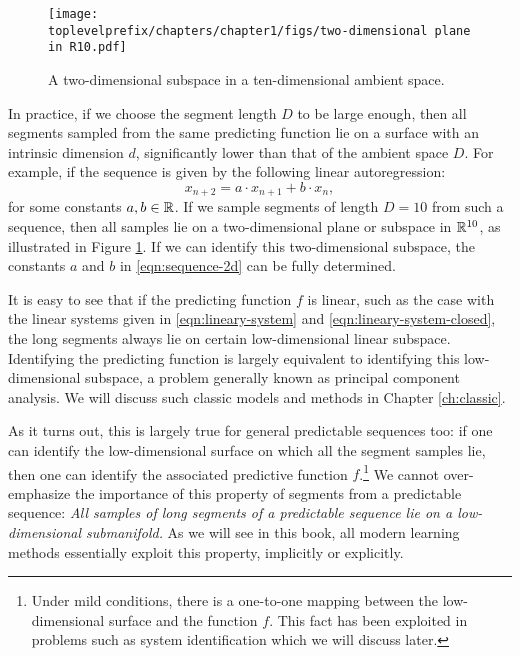 \documentclass[../../book-main.tex]{subfiles}
\begin{document}
\begin{figure}[t]
\centering
\texttt{[image: \\toplevelprefix/chapters/chapter1/figs/two-dimensional plane in R10.pdf]}
    \caption{A two-dimensional subspace in a ten-dimensional ambient space.}
    \label{fig:lowdimplane}
\end{figure}
In practice, if we choose the segment length $D$ to be large enough, then all segments sampled from the same predicting function lie on a surface with an intrinsic dimension $d$, significantly lower than that of the ambient space $D$. For example, if the sequence is given by the following linear autoregression:
\begin{equation}
    x_{n+2} = a\cdot x_{n+1} + b\cdot x_n,
    \label{eqn:sequence-2d}
\end{equation}
for some constants $a, b \in \mathbb{R}$. If we sample segments of length $D =10$ from such a sequence, then all samples lie on a two-dimensional plane or subspace in $\mathbb{R}^{10}$, as illustrated in Figure \ref{fig:lowdimplane}. If we can identify this two-dimensional subspace, the constants $a$ and $b$ in \eqref{eqn:sequence-2d} can be fully determined. 


It is easy to see that if the predicting function $f$ is linear, such as the case with the linear systems given in \eqref{eqn:lineary-system} and \eqref{eqn:lineary-system-closed}, the long segments always lie on certain low-dimensional linear subspace. Identifying the predicting function is largely equivalent to identifying this low-dimensional subspace, a problem generally known as principal component analysis. We will discuss such classic models and methods in Chapter \ref{ch:classic}.

As it turns out, this is largely true for general predictable sequences too: if one can identify the low-dimensional surface on which all the segment samples lie, then one can identify the associated predictive function $f$.\footnote{Under mild conditions, there is a one-to-one mapping between the low-dimensional surface and the function $f$. This fact has been exploited in problems such as system identification which we will discuss later.} We cannot over-emphasize the importance of this property of segments from a predictable sequence: {\em All samples of long segments of a predictable sequence lie on a low-dimensional submanifold.} As we will see in this book, all modern learning methods essentially exploit this property, implicitly or explicitly. %
\end{document}
